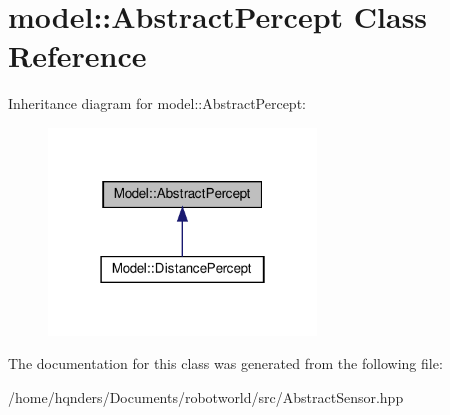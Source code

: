 \hypertarget{class_model_1_1_abstract_percept}{}\section{model\+:\+:Abstract\+Percept Class Reference}
\label{class_model_1_1_abstract_percept}


Inheritance diagram for model\+:\+:Abstract\+Percept\+:
\nopagebreak
\begin{figure}[H]
\begin{center}
\leavevmode
\includegraphics[width=202pt]{class_model_1_1_abstract_percept__inherit__graph}
\end{center}
\end{figure}


The documentation for this class was generated from the following file\+:\begin{DoxyCompactItemize}
\item 
/home/hqnders/\+Documents/robotworld/src/Abstract\+Sensor.\+hpp\end{DoxyCompactItemize}
